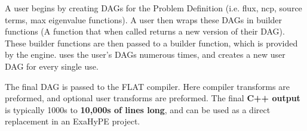 A user begins by creating DAGs for the Problem Definition (i.e. flux, ncp, source terms, max eigenvalue functions).
A user then wraps these DAGs in builder functions (A function that when called returns a new version of their DAG).
These builder functions are then passed to a  builder function, which is provided by the engine.
 uses the user's DAGs numerous times, and creates a new user DAG for every single use.

The final  DAG is passed to the FLAT compiler.
Here compiler transforms are preformed, and optional user transforms are preformed.
The final \textbf{C++ output} is typically 1000s to \textbf{10,000s of lines long}, and can be used as a direct replacement in an ExaHyPE project.

